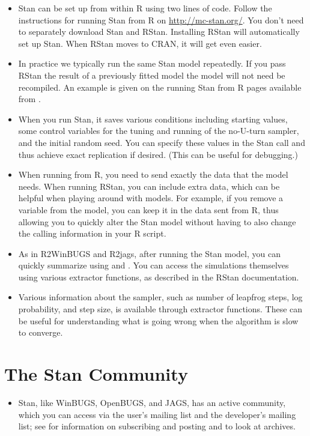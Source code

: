 \begin{itemize}

\item Stan can be set up from within R using two lines of code.
  Follow the instructions for running Stan from R on
  \url{http://mc-stan.org/}.  You don't need to separately download
  Stan and RStan.  Installing RStan will automatically set up Stan.
  When RStan moves to CRAN, it will get even easier.
\item In practice we typically run the same Stan model repeatedly.  If
  you pass RStan the result of a previously fitted model the model will 
  not need be recompiled. An example is given on the running
  Stan from R pages available from .
\item When you run Stan, it saves various conditions including
  starting values, some control variables for the tuning and running
  of the no-U-turn sampler, and the initial random seed. You can
  specify these values in the Stan call and thus achieve exact
  replication if desired.  (This can be useful for debugging.)
\item When running \BUGS from R, you need to send exactly the data
  that the model needs.  When running RStan, you can include extra
  data, which can be helpful when playing around with models.  For
  example, if you remove a variable  from the model, you can keep
  it in the data sent from R, thus allowing you to quickly alter the
  Stan model without having to also change the calling information in
  your R script.
\item As in R2WinBUGS and R2jags, after running the Stan model, you
  can quickly summarize using  and .  You
  can access the simulations themselves using various extractor
  functions, as described in the RStan documentation.  
\item Various information about the sampler, such as number of
  leapfrog steps, log probability, and step size, is available through
  extractor functions.   These can be useful for understanding what is
  going wrong when the algorithm is slow to converge.
\end{itemize}

\section{The Stan Community}

\begin{itemize}
\item Stan, like WinBUGS, OpenBUGS, and JAGS, has an active community,
  which you can access via the user's mailing list and the developer's
  mailing list; see  for information on
  subscribing and posting and to look at archives.
\end{itemize}


